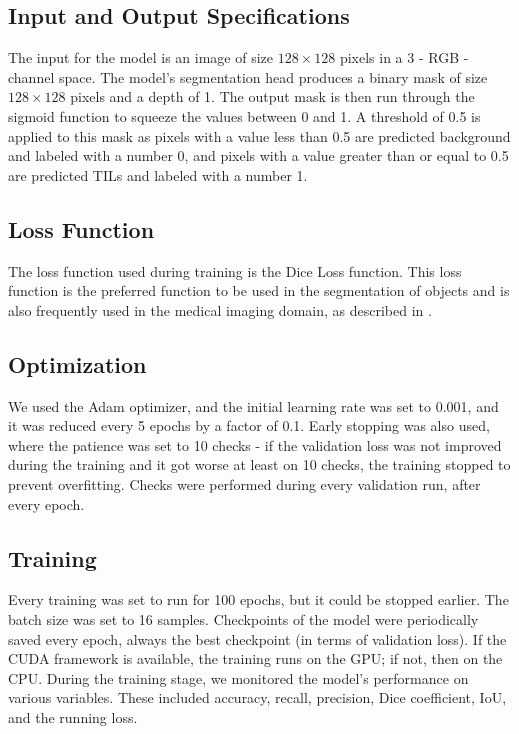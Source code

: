 \subsection{Input and Output Specifications}
The input for the model is an image of size $128\!\times\!128$ pixels in a 3 - RGB - channel space. The model's segmentation head produces a binary mask of size $128\!\times\!128$ pixels and a depth of 1. The output mask is then run through the sigmoid function to squeeze the values between 0 and 1. A threshold of 0.5 is applied to this mask as pixels with a value less than 0.5 are predicted background and labeled with a number 0, and pixels with a value greater than or equal to 0.5 are predicted TILs and labeled with a number 1.

\subsection{Loss Function}
The loss function used during training is the Dice Loss function. This loss function is the preferred function to be used in the segmentation of objects and is also frequently used in the medical imaging domain, as described in \cite{Zhang2021}.

\subsection{Optimization}
We used the Adam optimizer, and the initial learning rate was set to 0.001, and it was reduced every 5 epochs by a factor of 0.1. Early stopping was also used, where the patience was set to 10 checks - if the validation loss was not improved during the training and it got worse at least on 10 checks, the training stopped to prevent overfitting. Checks were performed during every validation run, after every epoch.

\subsection{Training}
Every training was set to run for 100 epochs, but it could be stopped earlier. The batch size was set to 16 samples. Checkpoints of the model were periodically saved every epoch, always the best checkpoint (in terms of validation loss). If the CUDA framework is available, the training runs on the GPU; if not, then on the CPU. During the training stage, we monitored the model's performance on various variables. These included accuracy, recall, precision, Dice coefficient, IoU, and the running loss.

